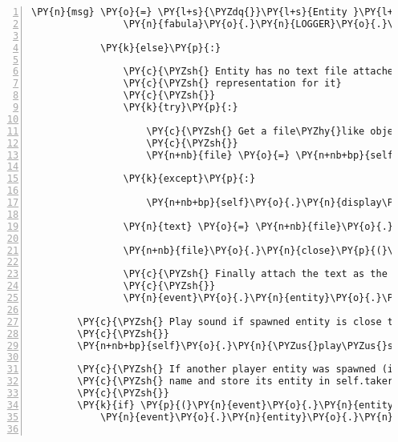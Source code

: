 \begin{Verbatim}[commandchars=\\\{\},numbers=left,firstnumber=1,stepnumber=1]
                \PY{n}{msg} \PY{o}{=} \PY{l+s}{\PYZdq{}}\PY{l+s}{Entity }\PY{l+s}{\PYZsq{}}\PY{l+s}{\PYZob{}\PYZcb{}}\PY{l+s}{\PYZsq{}}\PY{l+s}{ already has an text asset}\PY{l+s}{\PYZdq{}}
                \PY{n}{fabula}\PY{o}{.}\PY{n}{LOGGER}\PY{o}{.}\PY{n}{info}\PY{p}{(}\PY{n}{msg}\PY{o}{.}\PY{n}{format}\PY{p}{(}\PY{n}{event}\PY{o}{.}\PY{n}{entity}\PY{o}{.}\PY{n}{identifier}\PY{p}{)}\PY{p}{)}

            \PY{k}{else}\PY{p}{:}

                \PY{c}{\PYZsh{} Entity has no text file attached so get a \PYZsq{}text/plain\PYZsq{}}
                \PY{c}{\PYZsh{} representation for it}
                \PY{c}{\PYZsh{}}
                \PY{k}{try}\PY{p}{:}

                    \PY{c}{\PYZsh{} Get a file\PYZhy{}like object from asset manager}
                    \PY{c}{\PYZsh{}}
                    \PY{n+nb}{file} \PY{o}{=} \PY{n+nb+bp}{self}\PY{o}{.}\PY{n}{assets}\PY{o}{.}\PY{n}{fetch}\PY{p}{(}\PY{n}{event}\PY{o}{.}\PY{n}{entity}\PY{o}{.}\PY{n}{assets}\PY{p}{[}\PY{l+s}{\PYZsq{}}\PY{l+s}{text/plain}\PY{l+s}{\PYZsq{}}\PY{p}{]}\PY{o}{.}\PY{n}{uri}\PY{p}{,} \PY{n}{mode}\PY{o}{=}\PY{l+s}{\PYZsq{}}\PY{l+s}{t}\PY{l+s}{\PYZsq{}}\PY{p}{)}

                \PY{k}{except}\PY{p}{:}

                    \PY{n+nb+bp}{self}\PY{o}{.}\PY{n}{display\PYZus{}asset\PYZus{}exception}\PY{p}{(}\PY{n}{event}\PY{o}{.}\PY{n}{entity}\PY{o}{.}\PY{n}{assets}\PY{p}{[}\PY{l+s}{\PYZsq{}}\PY{l+s}{text/plain}\PY{l+s}{\PYZsq{}}\PY{p}{]}\PY{o}{.}\PY{n}{uri}\PY{p}{)}

                \PY{n}{text} \PY{o}{=} \PY{n+nb}{file}\PY{o}{.}\PY{n}{readlines}\PY{p}{(}\PY{p}{)}

                \PY{n+nb}{file}\PY{o}{.}\PY{n}{close}\PY{p}{(}\PY{p}{)}

                \PY{c}{\PYZsh{} Finally attach the text as the entity\PYZsq{}s asset}
                \PY{c}{\PYZsh{}}
                \PY{n}{event}\PY{o}{.}\PY{n}{entity}\PY{o}{.}\PY{n}{assets}\PY{p}{[}\PY{l+s}{\PYZsq{}}\PY{l+s}{text/plain}\PY{l+s}{\PYZsq{}}\PY{p}{]}\PY{o}{.}\PY{n}{data} \PY{o}{=} \PY{n}{text}

        \PY{c}{\PYZsh{} Play sound if spawned entity is close to client}
        \PY{c}{\PYZsh{}}
        \PY{n+nb+bp}{self}\PY{o}{.}\PY{n}{\PYZus{}play\PYZus{}sound\PYZus{}surrounding\PYZus{}entity}\PY{p}{(}\PY{n}{event}\PY{o}{.}\PY{n}{entity}\PY{p}{)}

        \PY{c}{\PYZsh{} If another player entity was spawned (i.e. is in the room), play its}
        \PY{c}{\PYZsh{} name and store its entity in self.taker\PYZus{}in\PYZus{}room\PYZus{}dict}
        \PY{c}{\PYZsh{}}
        \PY{k}{if} \PY{p}{(}\PY{n}{event}\PY{o}{.}\PY{n}{entity}\PY{o}{.}\PY{n}{entity\PYZus{}type} \PY{o}{==} \PY{n}{fabula}\PY{o}{.}\PY{n}{PLAYER} \PY{o+ow}{and}
            \PY{n}{event}\PY{o}{.}\PY{n}{entity}\PY{o}{.}\PY{n}{identifier} \PY{o+ow}{is} \PY{o+ow}{not} \PY{n+nb+bp}{self}\PY{o}{.}\PY{n}{host}\PY{o}{.}\PY{n}{client\PYZus{}id}\PY{p}{)}\PY{p}{:}


\end{Verbatim}
